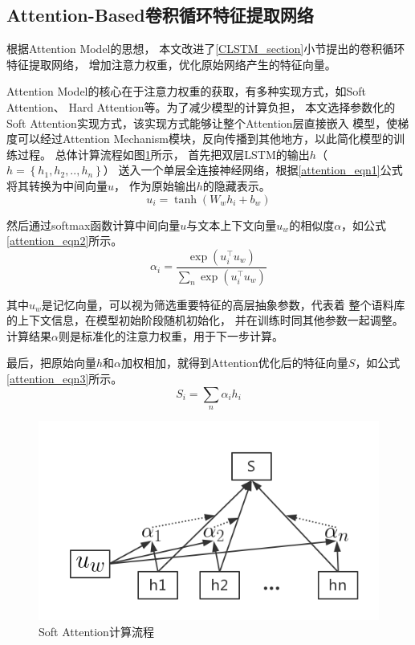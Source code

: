 \subsection{Attention-Based卷积循环特征提取网络}
\label{ACLSTM_section}
根据Attention Model的思想，
本文改进了\ref{CLSTM_section}小节提出的卷积循环特征提取网络，
增加注意力权重，优化原始网络产生的特征向量。

Attention Model的核心在于注意力权重的获取，有多种实现方式，如Soft Attention、
Hard Attention等。为了减少模型的计算负担，
本文选择参数化的Soft Attention实现方式，该实现方式能够让整个Attention层直接嵌入
模型，使梯度可以经过Attention Mechanism模块，反向传播到其他地方，以此简化模型的训练过程。
总体计算流程如图\ref{Soft_Attention}所示，
首先把双层LSTM的输出$h$（$h=\left \{ h_1,h_2,..,h_n\right\}$）
送入一个单层全连接神经网络，根据\ref{attention_eqn1}公式将其转换为中间向量$u$，
作为原始输出$h$的隐藏表示。
\begin{equation}
    u_i=\tanh\left ( W_wh_i+b_w \right )
    \label{attention_eqn1}
\end{equation}

然后通过softmax函数计算中间向量$u$与文本上下文向量$u_w$的相似度$\alpha$，如公式\ref{attention_eqn2}所示。
\begin{equation}
    \alpha_i=\frac{\exp\left ( u_{i}^{\top }u_w \right )}{\sum_n\exp\left ( u_{i}^{\top }u_w \right )}
    \label{attention_eqn2}
\end{equation}

其中$u_w$是记忆向量，可以视为筛选重要特征的高层抽象参数，代表着
整个语料库的上下文信息，在模型初始阶段随机初始化，
并在训练时同其他参数一起调整。计算结果$\alpha$则是标准化的注意力权重，用于下一步计算。

最后，把原始向量$h$和$\alpha$加权相加，就得到Attention优化后的特征向量$S$，如公式\ref{attention_eqn3}所示。
\begin{equation}
    S_i=\sum_n\alpha_ih_i
    \label{attention_eqn3}
\end{equation}
\begin{figure}[h]
    \includegraphics[scale=0.5]{picture/Attention.png}
    \caption{Soft Attention计算流程}
    \label{Soft_Attention}
\end{figure}

